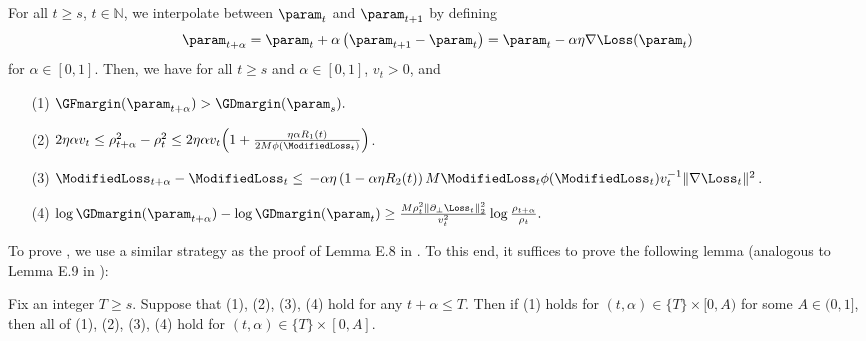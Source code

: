 \begin{theorem}
\begin{equation*}
    \end{equation*}
    For all $t \ge s$, $t \in \mathbb{N}$, we interpolate between $\param_t$ and $\param_{t+1}$ by defining
    \begin{equation*}
        \param_{t+\alpha} = \param_t + \alpha \left( \param_{t+1} - \param_t \right) = \param_t - \alpha \eta \nabla \Loss (\param_t)
    \end{equation*}
    for $\alpha \in [0, 1]$. Then, we have for all $t \ge s$ and $\alpha \in [0, 1]$, $v_t > 0$, and
    \begin{itemize}
        \item[(1)] $ \GFmargin (\param_{t+\alpha}) > \GDmargin (\param_{s}) . $
        \item[(2)] $ 2 \eta \alpha v_t \le \rho_{t+\alpha}^2 - \rho_t^2 \le 2 \eta \alpha v_t \Big ( 1+ \frac{\eta \alpha R_1 (t) }{2M \phi(\ModifiedLoss_t)} \Big)$. 
        \item[(3)] $ \ModifiedLoss_{t+\alpha} - \ModifiedLoss_t \le \, - \alpha \eta \left( 1- \alpha \eta R_2 (t) \right) M \ModifiedLoss_t \phi (\ModifiedLoss_t) v_t^{-1} \|\nabla \Loss_t\|^2$.
        \item[(4)] $ \log \GDmargin(\param_{t+\alpha}) - \log \GDmargin(\param_t) \ge \frac{M\rho_t^2\| \partial_\perp \Loss_t \|_2^2}{v_t^2 } \log \frac{\rho_{t+\alpha}}{\rho_t} . $
\end{itemize}
\end{theorem}

To prove , we use a similar strategy as the proof of Lemma E.8 in \cite{lyu2020gradient}. To this end, it suffices to prove the following lemma (analogous to Lemma E.9 in \cite{lyu2020gradient}):

\begin{lemma}
    Fix an integer $T \geq s$. Suppose that (1), (2), (3), (4) hold for any $t+\alpha \leq T$. Then if (1) holds for $(t, \alpha) \in\{T\} \times[0, A)$ for some $A \in(0,1]$, then all of (1), (2), (3), (4) hold for $(t, \alpha) \in\{T\} \times[0, A]$.
\end{lemma}

